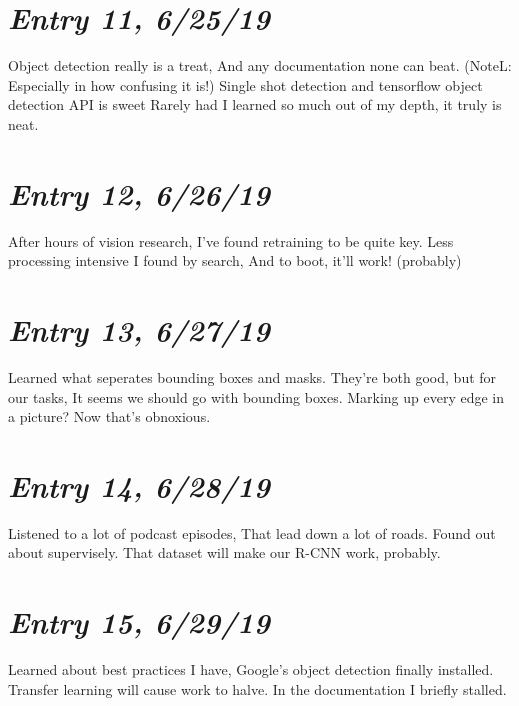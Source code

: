 \documentclass{article}
\begin{document}
\section{\Large \itshape Entry 11, 6/25/19}
    Object detection really is a treat,
\newline
And any documentation none can beat. (NoteL: Especially in how confusing it is!)
\newline
Single shot detection and tensorflow object detection API is sweet
\newline
Rarely had I learned so much out of my depth, it truly is neat.

\section{\Large \itshape Entry 12, 6/26/19}
    After hours of vision research,
\newline
I've found retraining to be quite key.
\newline
Less processing intensive I found by search,
\newline
And to boot, it'll work! (probably)

\section{\Large \itshape Entry 13, 6/27/19}
    Learned what seperates bounding boxes and masks.
\newline
They're both good, but for our tasks,
\newline
It seems we should go with bounding boxes.
\newline
Marking up every edge in a picture? Now that's obnoxious.

\section{\Large \itshape Entry 14, 6/28/19}
    Listened to a lot of podcast episodes,
\newline
That lead down a lot of roads.
\newline
Found out about supervisely.
\newline
That dataset will make our R-CNN work, probably.

\section{\Large \itshape Entry 15, 6/29/19}
    Learned about best practices I have,
\newline
Google's object detection finally installed.
\newline
Transfer learning will cause work to halve.
\newline
In the documentation I briefly stalled.
\end{document}
